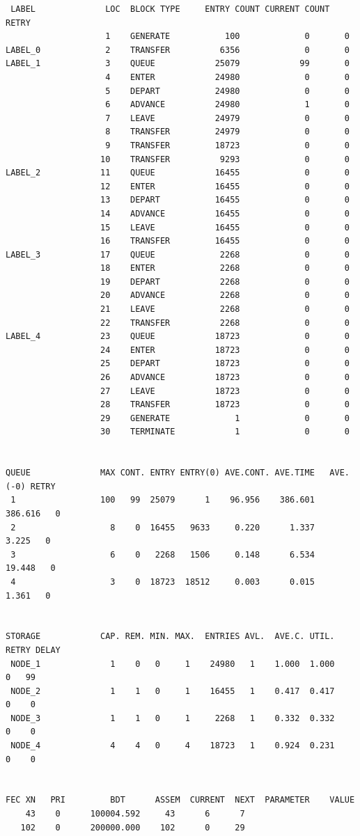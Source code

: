 \documentclass{article}
\begin{document}
\begin{lstlisting}
 LABEL              LOC  BLOCK TYPE     ENTRY COUNT CURRENT COUNT RETRY
                    1    GENERATE           100             0       0
LABEL_0             2    TRANSFER          6356             0       0
LABEL_1             3    QUEUE            25079            99       0
                    4    ENTER            24980             0       0
                    5    DEPART           24980             0       0
                    6    ADVANCE          24980             1       0
                    7    LEAVE            24979             0       0
                    8    TRANSFER         24979             0       0
                    9    TRANSFER         18723             0       0
                   10    TRANSFER          9293             0       0
LABEL_2            11    QUEUE            16455             0       0
                   12    ENTER            16455             0       0
                   13    DEPART           16455             0       0
                   14    ADVANCE          16455             0       0
                   15    LEAVE            16455             0       0
                   16    TRANSFER         16455             0       0
LABEL_3            17    QUEUE             2268             0       0
                   18    ENTER             2268             0       0
                   19    DEPART            2268             0       0
                   20    ADVANCE           2268             0       0
                   21    LEAVE             2268             0       0
                   22    TRANSFER          2268             0       0
LABEL_4            23    QUEUE            18723             0       0
                   24    ENTER            18723             0       0
                   25    DEPART           18723             0       0
                   26    ADVANCE          18723             0       0
                   27    LEAVE            18723             0       0
                   28    TRANSFER         18723             0       0
                   29    GENERATE             1             0       0
                   30    TERMINATE            1             0       0


QUEUE              MAX CONT. ENTRY ENTRY(0) AVE.CONT. AVE.TIME   AVE.(-0) RETRY
 1                 100   99  25079      1    96.956    386.601    386.616   0
 2                   8    0  16455   9633     0.220      1.337      3.225   0
 3                   6    0   2268   1506     0.148      6.534     19.448   0
 4                   3    0  18723  18512     0.003      0.015      1.361   0


STORAGE            CAP. REM. MIN. MAX.  ENTRIES AVL.  AVE.C. UTIL. RETRY DELAY
 NODE_1              1    0   0     1    24980   1    1.000  1.000    0   99
 NODE_2              1    1   0     1    16455   1    0.417  0.417    0    0
 NODE_3              1    1   0     1     2268   1    0.332  0.332    0    0
 NODE_4              4    4   0     4    18723   1    0.924  0.231    0    0


FEC XN   PRI         BDT      ASSEM  CURRENT  NEXT  PARAMETER    VALUE
    43    0      100004.592     43      6      7
   102    0      200000.000    102      0     29
\end{lstlisting}
\end{document}

